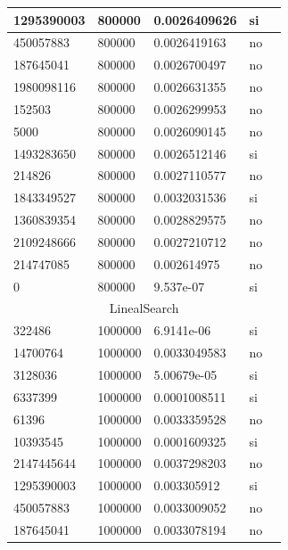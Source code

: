 \documentclass[12pt, fleqn]{article}                             %
\theoremstyle{break}                                            %
\begin{document}
\begin{longtable}{|m{5em}|m{5em}|m{10em}|m{5em}|@{}m{0pt}@{}}
            1295390003& 800000  & 0.0026409626 & si &\\[1em]    \hline
            450057883& 800000  & 0.0026419163 & no &\\[1em]    \hline
            187645041& 800000  & 0.0026700497 & no &\\[1em]    \hline
            1980098116& 800000  & 0.0026631355 & no &\\[1em]    \hline
            152503& 800000  & 0.0026299953 & no &\\[1em]    \hline
            5000& 800000  & 0.0026090145 & no &\\[1em]    \hline
            1493283650& 800000  & 0.0026512146 & si &\\[1em]    \hline
            214826& 800000  & 0.0027110577 & no &\\[1em]    \hline
            1843349527& 800000  & 0.0032031536 & si &\\[1em]    \hline
            1360839354& 800000  & 0.0028829575 & no &\\[1em]    \hline
            2109248666& 800000  & 0.0027210712 & no &\\[1em]    \hline
            214747085& 800000  & 0.002614975 & no &\\[1em]    \hline
            0& 800000  & 9.537e-07 & si &\\[1em]    \hline
            \multicolumn{5}{|c|}{LinealSearch}   \\          \hline
            322486& 1000000  & 6.9141e-06 & si &\\[1em]    \hline
            14700764& 1000000  & 0.0033049583 & no &\\[1em]    \hline
            3128036& 1000000  & 5.00679e-05 & si &\\[1em]    \hline
            6337399& 1000000  & 0.0001008511 & si &\\[1em]    \hline
            61396& 1000000  & 0.0033359528 & no &\\[1em]    \hline
            10393545& 1000000  & 0.0001609325 & si &\\[1em]    \hline
            2147445644& 1000000  & 0.0037298203 & no &\\[1em]    \hline
            1295390003& 1000000  & 0.003305912 & si &\\[1em]    \hline
            450057883& 1000000  & 0.0033009052 & no &\\[1em]    \hline
            187645041& 1000000  & 0.0033078194 & no &\\[1em]    \hline

\end{longtable}
\end{document}
